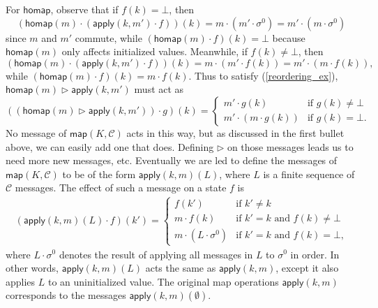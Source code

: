\documentclass[acmsmall,nonacm,12pt]{acmart}
\newcommand{\mc}[1]{\ensuremath{\mathcal{#1}}}
\newcommand{\msf}[1]{\ensuremath{\mathsf{#1}}}
\newcommand{\act}{\triangleright}
\theoremstyle{plain}
\theoremstyle{definition}
\begin{document}
For $\msf{homap}$, observe that if $f(k) = \bot$, then
\[
\left(\msf{homap}(m) \cdot (\msf{apply}(k, m') \cdot f)\right)(k) = m \cdot (m' \cdot \sigma^0) = m' \cdot (m \cdot \sigma^0)
\]
since $m$ and $m'$ commute, while $(\msf{homap}(m) \cdot f)(k) = \bot$ because $\msf{homap}(m)$ only affects initialized values.   Meanwhile, if $f(k) \neq \bot$, then
\[
\left(\msf{homap}(m) \cdot (\msf{apply}(k, m') \cdot f)\right)(k) = m \cdot (m' \cdot f(k)) = m' \cdot (m \cdot f(k)),
\]
while $(\msf{homap}(m) \cdot f)(k) = m \cdot f(k)$.  Thus to satisfy (\ref{reordering_ex}), $\msf{homap}(m) \act \msf{apply}(k, m')$ must act as
\[
((\msf{homap}(m) \act \msf{apply}(k, m')) \cdot g)(k) = \begin{cases} m' \cdot g(k) &\mbox{if $g(k) \neq \bot$} \\ m' \cdot (m \cdot g(k)) &\mbox{if $g(k) = \bot$.} \end{cases}
\]
No message of $\msf{map}(K, \mc{C})$ acts in this way, but as discussed in the first bullet above, we can easily add one that does.  Defining $\act$ on those messages leads us to need more new messages, etc.  Eventually we are led to define the messages of $\msf{map}(K, \mc{C})$ to be of the form $\msf{apply}(k, m)(L)$, where $L$ is a finite sequence of $\mc{C}$ messages.  The effect of such a message on a state $f$ is
\begin{align*}
(\msf{apply}(k, m)(L) \cdot f)(k') = \begin{cases} f(k') &\mbox{if $k' \neq k$} \\ m \cdot f(k) &\mbox{if $k' = k$ and $f(k) \neq \bot$} \\ m \cdot (L \cdot \sigma^0) &\mbox{if $k' = k$ and $f(k) = \bot$,} \end{cases}
\end{align*}
where $L \cdot \sigma^0$ denotes the result of applying all messages in $L$ to $\sigma^0$ in order.  In other words, $\msf{apply}(k, m)(L)$ acts the same as $\msf{apply}(k, m)$, except it also applies $L$ to an uninitialized value.  The original map operations $\msf{apply}(k, m)$ corresponds to the messages $\msf{apply}(k, m)(\emptyset)$.
\end{document}

